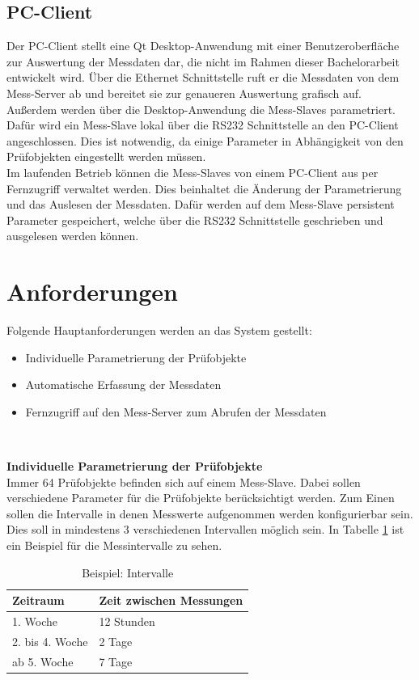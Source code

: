 \subsection{PC-Client}
\label{section_PC-Client}
Der PC-Client stellt eine Qt Desktop-Anwendung mit einer Benutzeroberfläche zur Auswertung der Messdaten dar, die nicht im Rahmen dieser Bachelorarbeit entwickelt wird. Über die Ethernet Schnittstelle ruft er die Messdaten von dem Mess-Server ab und bereitet sie zur genaueren Auswertung grafisch auf.\\
Außerdem werden über die Desktop-Anwendung die Mess-Slaves parametriert. Dafür wird ein Mess-Slave lokal über die RS232 Schnittstelle an den PC-Client angeschlossen. Dies ist notwendig, da einige Parameter in Abhängigkeit von den Prüfobjekten eingestellt werden müssen.\\
Im laufenden Betrieb können die Mess-Slaves von einem PC-Client aus per Fernzugriff verwaltet werden. Dies beinhaltet die Änderung der Parametrierung und das Auslesen der Messdaten. Dafür werden auf dem Mess-Slave persistent Parameter gespeichert, welche über die RS232 Schnittstelle geschrieben und ausgelesen werden können.



\section{Anforderungen}
Folgende Hauptanforderungen werden an das System gestellt:
\begin{itemize}
\item Individuelle Parametrierung der Prüfobjekte
\item Automatische Erfassung der Messdaten
\item Fernzugriff auf den Mess-Server zum Abrufen der Messdaten
\end{itemize}
\ 

\textbf{Individuelle Parametrierung der Prüfobjekte}\\
Immer 64 Prüfobjekte befinden sich auf einem Mess-Slave. Dabei sollen verschiedene Parameter für die Prüfobjekte berücksichtigt werden. 
Zum Einen sollen die Intervalle in denen Messwerte aufgenommen werden konfigurierbar sein. Dies soll in mindestens 3 verschiedenen Intervallen möglich sein. In Tabelle \ref{table_Intervalle} ist ein Beispiel für die Messintervalle zu sehen. 

 
\begin{table}[H]
\begin{center}
\begin{tabular}{|l|l|}\hline
Zeitraum & Zeit zwischen Messungen \\ \hline
1. Woche & 12 Stunden\\ 
2. bis 4. Woche & 2 Tage\\ 
ab 5. Woche & 7 Tage\\ \hline
\end{tabular}
\caption{Beispiel: Intervalle}
\label{table_Intervalle}
\end{center}
\end{table}



